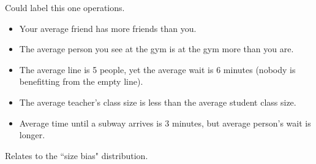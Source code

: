 \documentclass[11pt, oneside]{article}   	%
\title{}
\author{Nick Arnosti}
\begin{document}
\maketitle

{\color{blue} Could label this one operations.}
\begin{itemize}
\item Your average friend has more friends than you.
\item The average person you see at the gym is at the gym more than you are.
\item The average line is 5 people, yet the average wait is 6 minutes (nobody is benefitting from the empty line).
\item The average teacher's class size is less than the average student class size.
\item Average time until a subway arrives is 3 minutes, but average person's wait is longer.
\end{itemize}
Relates to the ``size bias" distribution.
\end{document}
